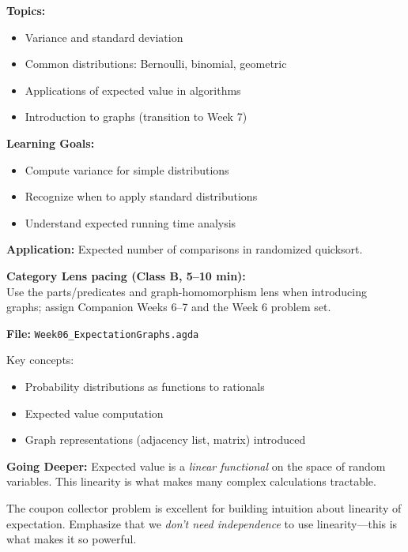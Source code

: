 \documentclass[11pt]{article}
\begin{document}
\begin{classbbox}
\textbf{Topics:}
\begin{itemize}
    \item Variance and standard deviation
    \item Common distributions: Bernoulli, binomial, geometric
    \item Applications of expected value in algorithms
    \item Introduction to graphs (transition to Week 7)
\end{itemize}

\textbf{Learning Goals:}
\begin{itemize}
    \item Compute variance for simple distributions
    \item Recognize when to apply standard distributions
    \item Understand expected running time analysis
\end{itemize}

\textbf{Application:} Expected number of comparisons in randomized quicksort.
\end{classbbox}

\textbf{Category Lens pacing (Class B, 5--10 min):}\\
Use the parts/predicates and graph-homomorphism lens when introducing graphs; assign Companion Weeks 6--7 and the Week 6 problem set.

\begin{agdabox}
\textbf{File:} \texttt{Week06\_ExpectationGraphs.agda}

Key concepts:
\begin{itemize}
    \item Probability distributions as functions to rationals
    \item Expected value computation
    \item Graph representations (adjacency list, matrix) introduced
\end{itemize}

\textbf{Going Deeper:} Expected value is a \textit{linear functional} on the space of random variables. This linearity is what makes many complex calculations tractable.
\end{agdabox}

\begin{tipbox}
The coupon collector problem is excellent for building intuition about linearity of expectation. Emphasize that we \textit{don't need independence} to use linearity---this is what makes it so powerful.
\end{tipbox}
\end{document}
